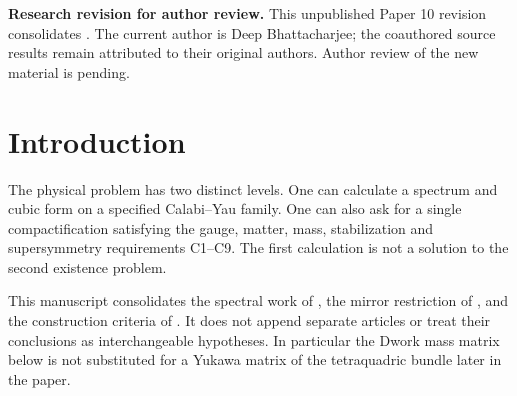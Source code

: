 
\begin{abstract}
We combine explicit spectral calculations for the Dwork and weighted
Fermat pencils with an audit of the Geometric Selection Conjecture.
The residue calculation determines the character labels, cubic couplings
and invariant-direction mass maps, while an index argument excludes three
standard-embedding families on free quotients of thirteen hypergeometric
complete-intersection types. For a nonstandard construction we fix one
tetraquadric equation, prove smoothness and a free degree-four action,
and calculate equivariant bundle cohomology by an exact determinant
certificate. Its projected charged spectrum contains three families and
one Higgs doublet pair. At the specified split-bundle point, however, an
additional Abelian gauge factor survives, the perturbative Yukawa matrices
fail the required rank test, and the tree-level volume remains flat.
We give selection and perturbation criteria and a targeted extension
construction, keeping their hypotheses separate from verified vacuum data.
No vacuum satisfying all nine conditions is constructed; the full
Geometric Selection Conjecture remains unproved.
\end{abstract}
\maketitle
\noindent\textbf{Research revision for author review.}
This unpublished Paper 10 revision consolidates
\cite{Dwork,Mirror,Paper10}. The current author is Deep Bhattacharjee;
the coauthored source results remain attributed to their original authors.
Author review of the new material is pending.
\setcounter{tocdepth}{1}
\clearpage
\tableofcontents
\clearpage

\section{Introduction}\label{sec:intro}
The physical problem has two distinct levels. One can calculate a
spectrum and cubic form on a specified Calabi--Yau family. One can also
ask for a single compactification satisfying the gauge, matter, mass,
stabilization and supersymmetry requirements C1--C9. The first calculation
is not a solution to the second existence problem.

This manuscript consolidates the spectral work of \cite{Dwork}, the
mirror restriction of \cite{Mirror}, and the construction criteria of
\cite{Paper10}. It does not append separate articles or treat their
conclusions as interchangeable hypotheses. In particular the Dwork
mass matrix below is not substituted for a Yukawa matrix of the
tetraquadric bundle later in the paper.

